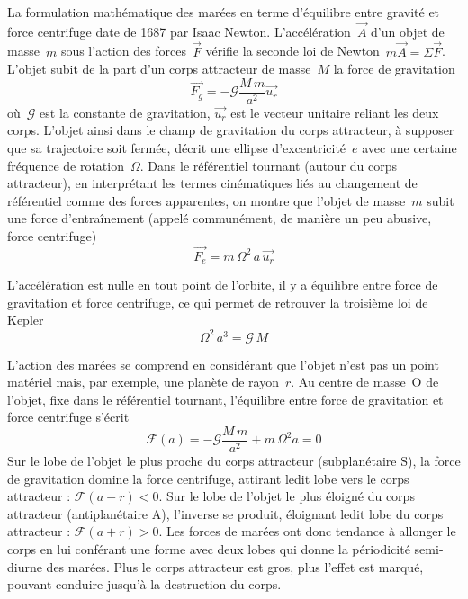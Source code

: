 
\sk
La formulation mathématique des marées en terme d'équilibre entre gravité et force centrifuge date de 1687 par Isaac Newton. L'accélération~$\vec{A}$ d'un objet de masse~$m$ sous l'action des forces~$\vec{F}$ vérifie la seconde loi de Newton~$m \vec{A} = \Sigma \vec{F}$. L'objet subit de la part d'un corps attracteur de masse~$M$ la force de gravitation
\[ \vec{F_g} = -\mathcal{G} \frac{M\,m}{a^2} \vec{u_r} \]
\noindent où~$\mathcal{G}$ est la constante de gravitation, $\vec{u_r}$ est le vecteur unitaire reliant les deux corps. 
\sk
L'objet ainsi dans le champ de gravitation du corps attracteur, à supposer que sa trajectoire soit fermée, décrit une ellipse d'excentricité~$e$ avec une certaine fréquence de rotation~$\Omega$. Dans le référentiel tournant (autour du corps attracteur), en interprétant les termes cinématiques liés au changement de référentiel comme des forces apparentes, on montre que l'objet de masse~$m$ subit une force d'entraînement (appelé communément, de manière un peu abusive, force centrifuge)
\[ \vec{F_e} = m \, \Omega^2 \, a \, \vec{u_r} \]

\sk
L'accélération est nulle en tout point de l'orbite, il y a équilibre entre force de gravitation et force centrifuge, ce qui permet de retrouver la troisième loi de Kepler
\[ \Omega^2 \, a^3 = \mathcal{G} \, M  \]

\sk
L'action des marées se comprend en considérant que l'objet n'est pas un point matériel mais, par exemple, une planète de rayon~$r$. Au centre de masse~O de l'objet, fixe dans le référentiel tournant, l'équilibre entre force de gravitation et force centrifuge s'écrit
\[ \mathcal{F}(a) = -\mathcal{G} \frac{M\,m}{a^2} + m \, \Omega^2 a = 0 \]
Sur le lobe de l'objet le plus proche du corps attracteur (subplanétaire S), la force de gravitation domine la force centrifuge, attirant ledit lobe vers le corps attracteur : $\mathcal{F}(a-r) < 0$. Sur le lobe de l'objet le plus éloigné du corps attracteur (antiplanétaire A), l'inverse se produit, éloignant ledit lobe du corps attracteur : $\mathcal{F}(a+r) > 0$. Les forces de marées ont donc tendance à allonger le corps en lui conférant une forme avec deux lobes qui donne la périodicité semi-diurne des marées. Plus le corps attracteur est gros, plus l'effet est marqué, pouvant conduire jusqu'à la destruction du corps.


